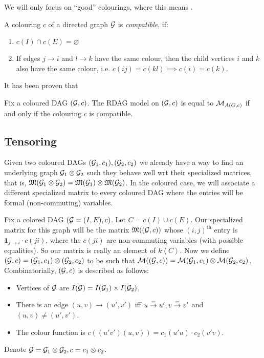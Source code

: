 We will only focus on ``good'' colourings, where this means .
\begin{defn}
A colouring $c$ of a directed graph ${\mathcal{G}}$ is \emph{compatible}, if:
\begin{enumerate}[label=(\alph*),itemsep=0pt]
\item $c(I)\cap c(E) = \varnothing$
\item If edges $j \to i$ and $l \to k$ have the same colour, then the child vertices $i$ and $k$ also have the same colour, i.e. $c(ij) = c(kl) \implies c(i) = c(k)$.
\end{enumerate}
\end{defn}

It has been proven that 
\begin{prop}
Fix a coloured DAG $({\mathcal{G}},c)$. The RDAG model on $({\mathcal{G}},c)$ is equal to
${\mathcal{M}}_{A(G,c)}$ if and only if the colouring $c$ is compatible.
\end{prop}

\subsection{Tensoring}

Given two coloured DAGs $({\mathcal{G}}_1,c_1), ({\mathcal{G}}_2,c_2)$ we already have a way to find an underlying graph ${\mathcal{G}}_1\otimes {\mathcal{G}}_2$ such they behave well wrt their specialized matrices, that is, ${\mathfrak{M}}({\mathcal{G}}_1\otimes {\mathcal{G}}_2) = {\mathfrak{M}}({\mathcal{G}}_1)\otimes {\mathfrak{M}}({\mathcal{G}}_2)$. In the coloured case, we will associate a different specialized matrix to every coloured DAG where the entries will be formal (non-commuting) variables. 

Fix a colored DAG $({\mathcal{G}} = (I,E),c)$. Let $C = c(I)\cup c(E)$. Our specialized matrix for this graph will be the matrix ${\mathfrak{M}}(({\mathcal{G}},c))$ whose $(i,j)^{\text{th}}$ entry is $\pmb 1_{j\to i}\cdot c(ji)$, where the $c(ji)$ are non-commuting variables (with possible equalities). So our matrix is really an element of $k\left<C\right>$. Now we define $({\mathcal{G}},c) = ({\mathcal{G}}_1,c_1)\otimes ({\mathcal{G}}_2,c_2)$ to be such that ${\mathcal{M}}(({\mathcal{G}},c)) = {\mathcal{M}}({\mathcal{G}}_1,c_1)\otimes {\mathcal{M}}({\mathcal{G}}_2,c_2)$. Combinatorially, $({\mathcal{G}},c)$ is described as follows:
\begin{itemize}[itemsep=0pt]
\item Vertices of ${\mathcal{G}}$ are $I({\mathcal{G}})= I({\mathcal{G}}_1)\times I({\mathcal{G}}_2)$,
\item There is an edge $(u,v)\to (u',v')$ iff $u\stackrel{=}{\to} u', v\stackrel{=}{\to} v'$ and $(u,v)\neq (u',v')$.
\item The colour function is $c((u'v')(u,v)) = c_1(u'u)\cdot c_2(v'v)$.
\end{itemize}
Denote ${\mathcal{G}} = {\mathcal{G}}_1\otimes {\mathcal{G}}_2, c=c_1\otimes c_2$.

